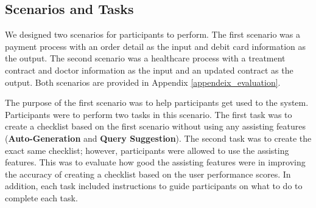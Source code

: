 \subsection{Scenarios and Tasks}
We designed two scenarios for participants to perform.
The first scenario was a payment process with an order detail as the input and debit card information as the output. The second scenario was a healthcare process with a treatment contract and doctor information as the input and an updated contract as the output. Both scenarios are provided in Appendix \ref{appendeix_evaluation}.


The purpose of the first scenario was to help participants get used to the system.
Participants were to perform two tasks in this scenario. The first task was to create a checklist based on the first scenario without using any assisting features (\textbf{Auto-Generation} and \textbf{Query Suggestion}). The second task was to create the exact same checklist; however, participants were allowed to use the assisting features. This was to evaluate how good the assisting features were in improving the accuracy of creating a checklist based on the user performance scores. In addition, each task included instructions to guide participants on what to do to complete each task.


